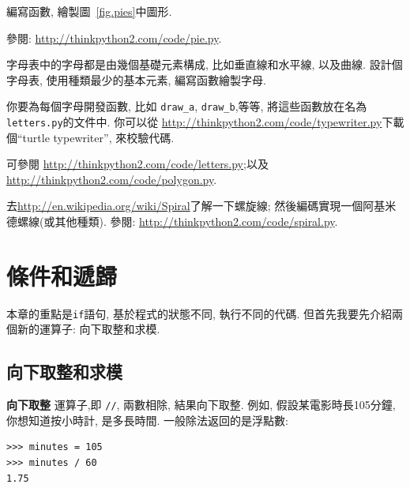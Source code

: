 \documentclass[10pt]{book}
\begin{document}
\begin{exercise}

編寫函數, 繪製圖~\ref{fig.pies}中圖形. 

參閱: \url{http://thinkpython2.com/code/pie.py}.

\end{exercise}

\begin{exercise}

字母表中的字母都是由幾個基礎元素構成, 比如垂直線和水平線, 以及曲線. 
設計個字母表, 使用種類最少的基本元素, 編寫函數繪製字母. 

你要為每個字母開發函數, 比如 \verb"draw_a", \verb"draw_b",等等, 
將這些函數放在名為{\tt letters.py}的文件中. 
你可以從 \url{http://thinkpython2.com/code/typewriter.py}下載個``turtle typewriter'', 
來校驗代碼. 

可參閱 \url{http://thinkpython2.com/code/letters.py};以及
\url{http://thinkpython2.com/code/polygon.py}.

\end{exercise}

\begin{exercise}

去\url{http://en.wikipedia.org/wiki/Spiral}了解一下螺旋線;
然後編碼實現一個阿基米德螺線(或其他種類). 
參閱: \url{http://thinkpython2.com/code/spiral.py}.

\end{exercise}


\chapter{條件和遞歸}

本章的重點是{\tt if}語句, 
基於程式的狀態不同, 執行不同的代碼. 
但首先我要先介紹兩個新的運算子: 向下取整和求模. 

\section{向下取整和求模}

{\bf 向下取整} 運算子,即 \verb"//", 
兩數相除, 結果向下取整. 
例如, 假設某電影時長105分鐘, 你想知道按小時計, 是多長時間. 
一般除法返回的是浮點數:

\begin{verbatim}
>>> minutes = 105
>>> minutes / 60
1.75
\end{verbatim}
\end{document}
